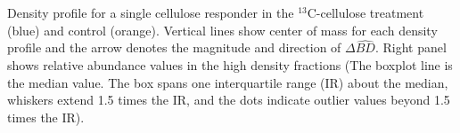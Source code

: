 Density profile for a single cellulose responder in the $^{13}$C-cellulose
treatment (blue) and control (orange). Vertical lines show center of mass for
each density profile and the arrow denotes the magnitude and direction of
$\Delta\hat{BD}$. Right panel shows relative abundance values in the high
density fractions (The boxplot line is the median value. The box spans one
interquartile range (IR) about the median, whiskers extend 1.5 times the IR,
and the dots indicate outlier values beyond 1.5 times the IR).   


